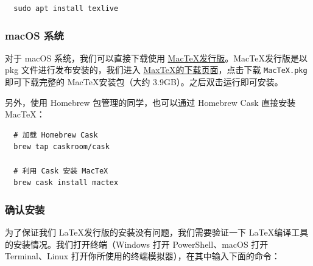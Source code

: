 \begin{verbatim}
  sudo apt install texlive
\end{verbatim}

\subsubsection{macOS 系统}
对于 macOS 系统，我们可以直接下载使用 \href{https://www.tug.org/mactex/}{Mac\TeX 发行版}。Mac\TeX 发行版是以 pkg 文件进行发布安装的，我们进入 \href{https://www.tug.org/mactex/mactex-download.html}{Max\TeX 的下载页面}，点击下载 \texttt{MacTeX.pkg} 即可下载完整的 Mac\TeX 安装包（大约 3.9GB）。之后双击运行即可安装。

另外，使用 Homebrew 包管理的同学，也可以通过 Homebrew Cask 直接安装 Mac\TeX：

\begin{verbatim}
  # 加载 Homebrew Cask
  brew tap caskroom/cask

  # 利用 Cask 安装 MacTeX
  brew cask install mactex
\end{verbatim}

\subsubsection{确认安装}
为了保证我们 \LaTeX 发行版的安装没有问题，我们需要验证一下 \LaTeX 编译工具的安装情况。我们打开终端（Windows 打开 PowerShell、macOS 打开 Terminal、Linux 打开你所使用的终端模拟器），在其中输入下面的命令：

